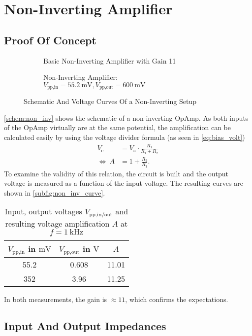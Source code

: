 \chapter{Non-Inverting Amplifier}
\section{Proof Of Concept}
\begin{figure}[tp]
	\centering
	\begin{subfigure}{0.4\textwidth}
		\centering
		\caption{Basic Non-Inverting Amplifier with Gain 11}
		\label{schem:non_inv}
	\end{subfigure}
	\begin{subfigure}{0.4\textwidth}
		\centering
		\caption{Non-Inverting Amplifier:\newline $V_\text{pp,in}=\SI{55.2}{\milli\volt}, V_\text{pp,out}=\SI{600}{\milli\volt}$}
		\label{subfig:non_inv_curve}
	\end{subfigure}
	\caption{Schematic And Voltage Curves Of a Non-Inverting Setup}
\end{figure}
\autoref{schem:non_inv} shows the schematic of a non-inverting OpAmp.
As both inputs of the OpAmp virtually are at the same potential, the amplification can be calculated easily by using the voltage divider formula (as seen in \autoref{eq:bias_volt})
\begin{align*}
	V_\text{e}&=V_\text{a}\cdot\frac{R_1}{R_1+R_2} \\
	\Leftrightarrow\ A &=1+\frac{R_2}{R_1}.
\end{align*}
To examine the validity of this relation, the circuit is built and the output voltage is measured as a function of the input voltage.
The resulting curves are shown in \autoref{subfig:non_inv_curve}.
\begin{table}[b!]
	\centering
	\caption{Input, output voltages $V_\text{pp,in/out}$ and resulting voltage amplification $A$ at $f=\SI{1}{\kilo\hertz}$}
	\label{tab:non_inv_vals}
	\begin{tabular}{SSS}
		\toprule
		{$V_\text{pp,in}$ in $\si{\milli\volt}$}&	{$V_\text{pp,out}$ in $\si{\volt}$}&	{$A$}\\
		\midrule
		\num{55.2}	&	\num{0.608}	&	\num{11.01}\\
		\num{352}	&	\num{3.96}	&	\num{11.25}\\
		\bottomrule
	\end{tabular}
\end{table}
In both measurements, the gain is $\approx 11$, which confirms the expectations.

\section{Input And Output Impedances}
